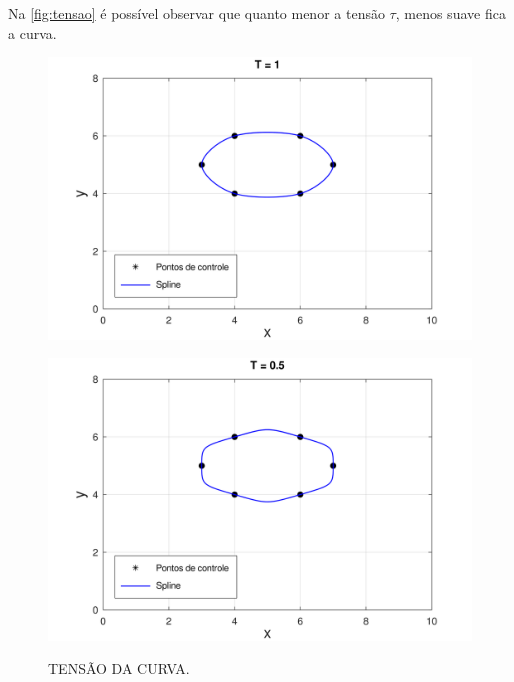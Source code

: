 Na \autoref{fig:tensao} é possível observar que quanto menor a tensão $\tau$, menos suave fica a curva.

\begin{figure}[h!]
    \caption{TENSÃO DA CURVA.}
    \centering
    \begin{minipage}[b]{0.45\textwidth}
        \centering
        \includegraphics[width=1\linewidth]{fig/cat_rom_t1.png}
        \label{fig:tesao1}
    \end{minipage}
    \hfill
    \begin{minipage}[b]{0.45\textwidth}
        \centering
        \includegraphics[width=1\linewidth]{fig/cat_rom_t05.png}
        \label{fig:tensao05}
    \end{minipage}

    \vspace{1cm}


\end{figure}
